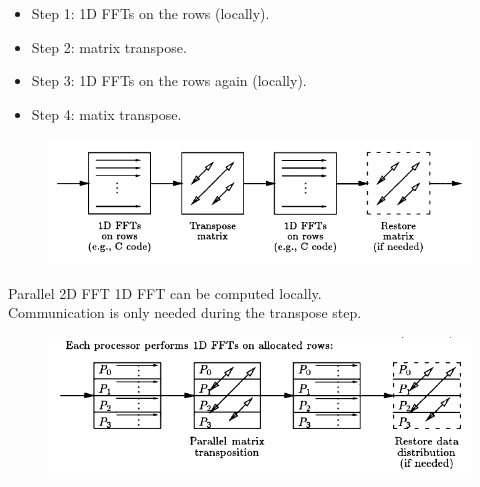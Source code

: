 \documentclass{beamer}
\begin{document}
\begin{frame}
\begin{itemize}
\item Step 1: 1D FFTs on the rows (locally).
\item Step 2: matrix transpose.
\item Step 3: 1D FFTs on the rows again (locally).
\item Step 4: matix transpose.
\end{itemize}
\begin{figure}
\includegraphics[width=\linewidth]{fft1.png}
\end{figure}
\end{frame}

\begin{frame}{Parallel 2D FFT}
1D FFT can be computed locally. \\Communication is only needed during the transpose step.
\begin{figure}
\includegraphics[width=\linewidth]{fft2.png}
\end{figure}
\end{frame}
\end{document}

